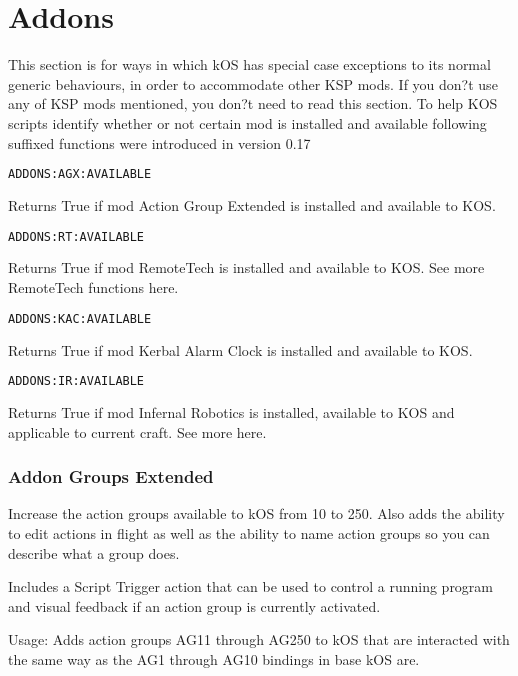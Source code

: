 \part{Addons}
	This section is for ways in which kOS has special case exceptions to its normal generic behaviours, in order to accommodate other KSP mods. If you don?t use any of KSP mods mentioned, you don?t need to read this section.
	To help KOS scripts identify whether or not certain mod is installed and available following suffixed functions were introduced in version 0.17

\begin{lstlisting}[frame=single,language=XML]
ADDONS:AGX:AVAILABLE
\end{lstlisting}

Returns True if mod Action Group Extended is installed and available to KOS.

\begin{lstlisting}[frame=single,language=XML]
ADDONS:RT:AVAILABLE
\end{lstlisting}

Returns True if mod RemoteTech is installed and available to KOS. See more RemoteTech functions here.

\begin{lstlisting}[frame=single,language=XML]
ADDONS:KAC:AVAILABLE
\end{lstlisting}

Returns True if mod Kerbal Alarm Clock is installed and available to KOS.

\begin{lstlisting}[frame=single,language=XML]
ADDONS:IR:AVAILABLE
\end{lstlisting}

Returns True if mod Infernal Robotics is installed, available to KOS and applicable to current craft. See more here.
	\section{Addon Groups Extended}%
	Increase the action groups available to kOS from 10 to 250. Also adds the ability to edit actions in flight as well as the ability to name action groups so you can describe what a group does.

Includes a Script Trigger action that can be used to control a running program and visual feedback if an action group is currently activated.

Usage: Adds action groups AG11 through AG250 to kOS that are interacted with the same way as the AG1 through AG10 bindings in base kOS are.

